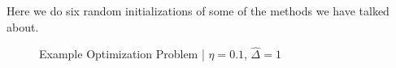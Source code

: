 \documentclass[12pt]{article}
\begin{document}
Here we do six random initializations of some of the methods we have talked about.

\vspace{5mm}

\begin{figure}[h]
\centering
{}


\caption{Example Optimization Problem | $\eta=0.1$, $\hat{\Delta}=1$}
\end{figure}
\end{document}
